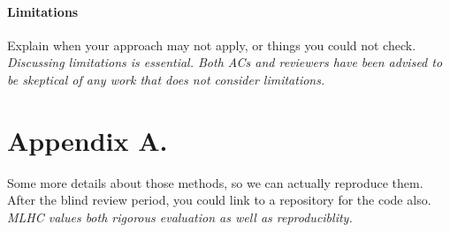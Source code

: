 \documentclass[pmlr]{jmlr}%
\begin{document}
\paragraph{Limitations}

Explain when your approach may not apply, or things you could not
check.  \emph{Discussing limitations is essential.  Both ACs and
  reviewers have been advised to be skeptical of any work that does
  not consider limitations.}




\appendix
\section*{Appendix A.}

Some more details about those methods, so we can actually reproduce
them.  After the blind review period, you could link to a repository
for the code also.  \emph{MLHC values both rigorous evaluation as well
  as reproduciblity.}
\end{document}
